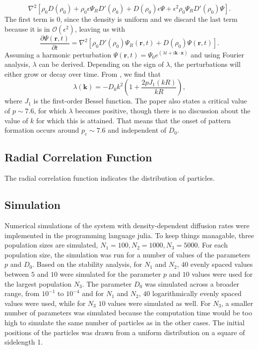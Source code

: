 \documentclass{article}
\renewcommand{\vec}[1]{\boldsymbol{#1}}
\begin{document}
\begin{equation}
\nabla^2\left[\rho_0 D(\rho_0) + \rho_0\epsilon \Psi_R D'(\rho_0)+ D(\rho_0)\epsilon \Psi + \epsilon^2 \rho_0 \Psi_R D'(\rho_0) \Psi\right].
\end{equation}
The first term is $0$, since the density is uniform and we discard the last term because it is in $\mathcal{O}(\epsilon^2)$, leaving us with
\begin{equation}
    \frac{\partial \Psi(\vec{r},t)}{\partial t} = \nabla^2\left[ \rho_0  D'(\rho_0)\Psi_R(\vec{r},t)+ D(\rho_0) \Psi(\vec{r},t) \right].
\end{equation}
Assuming a harmonic perturbation $\Psi(\vec{r}, t) = \Psi_0 e^{(\lambda t + i \vec{k} \cdot \vec{x})}$ and using Fourier analysis, $\lambda$ can be derived.
Depending on the sign of $\lambda$, the perturbations will either grow or decay over time.
From \cite{lopezMacroscopicDescriptionParticle2006}, we find that 
\begin{equation}
    \lambda(\vec{k}) = -D_0 k^2\left(1 + \frac{2pJ_1(kR)}{kR}\right),
\end{equation}
where $J_1$ is the first-order Bessel function.
The paper also states a critical value of $p\sim 7.6$, for which $\lambda $ becomes positive, though there is no discussion about the value of $k$ for which this is attained. 
That means that the onset of pattern formation occurs around $p_c \sim 7.6$ and independent of $D_0$.

\subsection{Radial Correlation Function}
The radial correlation function indicates the distribution of particles. 


\subsection{Simulation}
Numerical simulations of the system with density-dependent diffusion rates were implemented in the programming language julia.
To keep things managable, three population sizes are simulated, $N_1=100, N_2 = 1000, N_3 = 5000$.
For each population size, the simulation was run for a number of values of the parameters $p$ and $D_0$.
Based on the stability analysis, for $N_1$ and $N_2$, $40$ evenly spaced values between $5$ and $10$ were simulated for the parameter $p$ and $10$ values were used for the largest population $N_3$.
The parameter $D_0$ was simulated across a broader range, from $10^{-1}$ to $10^{-4}$ and for $N_1$ and $N_2$, $40$ logarithmically evenly spaced values were used, while for $N_3$ $10$ values were simulated as well.
For $N_3$, a smaller number of parameters was simulated because the computation time would be too high to simulate the same number of particles as in the other cases.
The initial positions of the particles was drawn from a uniform distribution on a square of sidelength 1.
\end{document}
